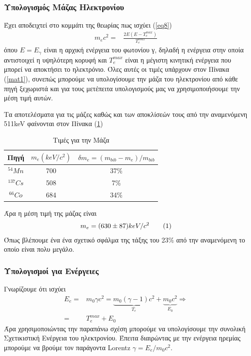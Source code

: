 \documentclass[a4paper]{article}
\newcommand\numberthis{\addtocounter{equation}{1}\tag{\theequation}}
\begin{document}
	\subsubsection*{Υπολογισμός Μάζας Ηλεκτρονίου}
	Έχει αποδειχτεί στο κομμάτι της θεωρίας πως ισχύει (\ref{eq8}) 
	\begin{align*}
		m_ec^2 =& \frac{2E(E-T_e^{max})}{T_e^{max}}
	\end{align*}
	όπου $E=E_\gamma$ είναι η αρχική ενέργεια του φωτονίου γ, δηλαδή η ενέργεια στην οποία αντιστοιχεί η υψηλότερη κορυφή και $T_e^{max}$ είναι η μέγιστη κινητική ενέργεια που μπορεί να αποκτήσει το ηλεκτρόνιο. Όλες αυτές οι τιμές υπάρχουν στον Πίνακα (\ref{mat1}), συνεπώς μπορούμε να υπολογίσουμε την μάζα του ηλεκτρονίου από κάθε πηγή ξεχωριστά και για τους μετέπειτα υπολογισμούς μας να χρησιμοποιήσουμε την μέση τιμή αυτών.
	
	Τα αποτελέσματα για τις μάζες καθώς και των αποκλίσεών τους από την αναμενόμενη 511keV φαίνονται στον Πίνακα (\ref{mat2}) 
	\begin{table}
			\centering 
			\begin{tabular}{c|c|c}
					Πηγή & $m_e(keV/c^2)$ & $\delta m_e= (m_{bib}-m_e)/m_{bib}$ \\ \hline
					$^{54}Mn $ & 700 & 37\%\\
					$^{137}Cs$ & 508 &  7\%\\
					$^{66}Co $ & 684 &  34\%\\
			\end{tabular}
			\caption{Τιμές για την Μάζα}
			\label{mat2}
		\end{table}	
	Άρα η μέση τιμή της μάζας είναι 
		\begin{align*}
			m_e = (630\pm87)keV/c^2 \numberthis
		\end{align*}
	Όπως βλέπουμε ένα ένα σχετικό σφάλμα της τάξης του 23\% από την αναμενόμενη το οποίο είναι πολυ μεγάλο.
	
	\subsubsection*{Υπολογισμοί για Ενέργειες}
	Γνωρίζουμε ότι ισχύει 
	\begin{align*}
		E_e =& m_0\gamma c^2 = \underbrace{m_0(\gamma-1)c^2}_{T_e} + \underbrace{m_0c^2}_{E_0} \Rightarrow\\
		    =& T_e^{max} + E_0 
	\end{align*}
	Άρα χρησιμοποιώντας την παραπάνω σχέση μπορούμε να υπολογίσουμε την συνολική Σχετικιστική Ενέργεια του ηλεκτρονίου. Έπειτα διαιρώντας με την ενέργεια ηρεμίας μπορούμε να βρούμε τον παράγοντα Lorentz $\gamma = E_e/m_0c^2$. 
	
\end{document}
